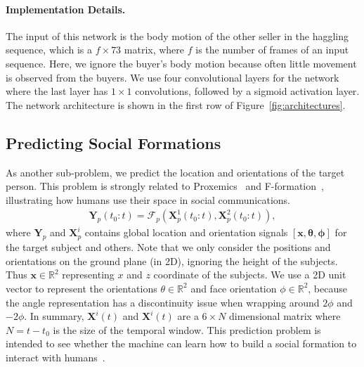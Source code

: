 
\paragraph{Implementation Details.}
\label{section:body2speak}
The input of this network is the body motion of the other seller in the haggling sequence, which is a $f \times 73$ matrix, where $f$ is the number of frames of an input sequence. Here, we ignore the buyer's body motion because often little movement is observed from the buyers.  We use four convolutional layers for the network where the last layer has $1\times1$ convolutions, followed by a sigmoid activation layer. The network architecture is shown in the first row of Figure~\ref{fig:architectures}.




\subsection{Predicting Social Formations}
As another sub-problem, we predict the location and orientations of the target person. This problem is strongly related to Proxemics~\cite{Hall66} and F-formation~\cite{kendon90}, illustrating how humans use their space in social communications.
\begin{gather}	
 \mathbf{Y}_p (t_0:t) = \mathcal{F}_p \left( \mathbf{X}_p^1(t_0:t), \mathbf{X}_p^2(t_0:t) \right),
 \label{eq:pred_formation}
\end{gather}
where $\mathbf{Y}_p$ and $\mathbf{X}_p^i$ contains global location and orientation signals $[\mathbf{x}, \boldsymbol{\theta}, \boldsymbol{\phi} ]$ for the target subject and others.
Note that we only consider the positions and orientations on the ground plane (in 2D), ignoring the height of the subjects. Thus $\mathbf{x} \in \mathbb{R}^2 $ representing $x$ and $z$ coordinate of the subjects. We use a 2D unit vector to represent the orientations $\theta \in \mathbb {R}^2$ and face orientation $\phi \in \mathbb{R}^2$, because the angle representation has a discontinuity issue when wrapping around $2\phi$ and $-2\phi$. In summary, $\mathbf{X}^i(t)$ and $\mathbf{X}^i(t)$ are a $6 \times N$ dimensional matrix where $N = t- t_0$ is the size of the temporal window. This prediction problem is intended to see whether the machine can learn how to build a social formation to interact with humans~\cite{vazquez2017towards}. %


